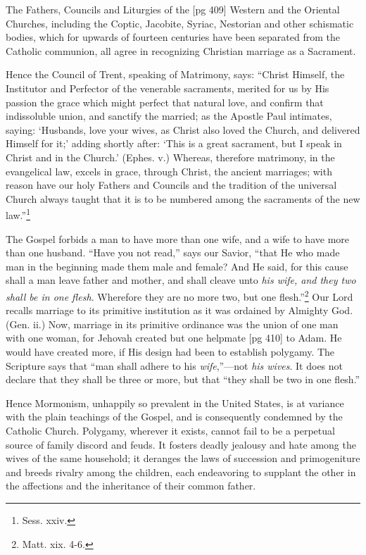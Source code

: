 The Fathers, Councils and Liturgies of the
[pg 409]
Western and the Oriental Churches, including the
Coptic, Jacobite, Syriac, Nestorian and other schismatic
bodies, which for upwards of fourteen centuries
have been separated from the Catholic communion,
all agree in recognizing Christian marriage
as a Sacrament.

Hence the Council of Trent, speaking of Matrimony,
says: “Christ Himself, the Institutor and
Perfector of the venerable sacraments, merited
for us by His passion the grace which might perfect
that natural love, and confirm that indissoluble
union, and sanctify the married; as the
Apostle Paul intimates, saying: ‘Husbands, love
your wives, as Christ also loved the Church, and
delivered Himself for it;’ adding shortly after:
‘This is a great sacrament, but I speak in Christ
and in the Church.’ (Ephes. v.) Whereas, therefore
matrimony, in the evangelical law, excels in
grace, through Christ, the ancient marriages; with
reason have our holy Fathers and Councils and
the tradition of the universal Church always
taught that it is to be numbered among the sacraments
of the new law.”\footnote{Sess. xxiv.}

The Gospel forbids a man to have more than
one wife, and a wife to have more than one husband.
“Have you not read,” says our Savior,
“that He who made man in the beginning made
them male and female? And He said, for this
cause shall a man leave father and mother, and
shall cleave unto \emph{his wife, and they two shall be
in one flesh}. Wherefore they are no more two,
but one flesh.”\footnote{Matt. xix.
4-6.} Our Lord recalls marriage to
its primitive institution as it was ordained by
Almighty God. (Gen. ii.) Now, marriage in its
primitive ordinance was the union of one man
with one woman, for Jehovah created but one helpmate
[pg 410]
to Adam. He would have created more, if His
design had been to establish polygamy. The Scripture
says that “man shall adhere to his \emph{wife},”—not
\emph{his wives}. It does not declare that they shall
be three or more, but that “they shall be two in
one flesh.”

Hence Mormonism, unhappily so prevalent in
the United States, is at variance with the plain
teachings of the Gospel, and is consequently condemned
by the Catholic Church. Polygamy, wherever
it exists, cannot fail to be a perpetual source
of family discord and feuds. It fosters deadly
jealousy and hate among the wives of the same
household; it deranges the laws of succession and
primogeniture and breeds rivalry among the children,
each endeavoring to supplant the other in
the affections and the inheritance of their common
father.

